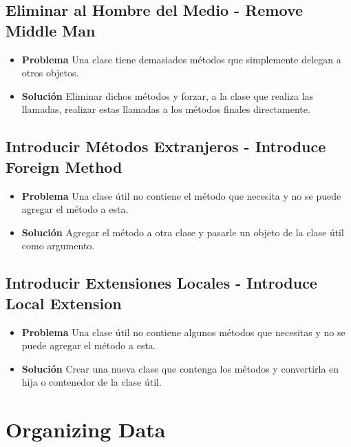 \documentclass[11pt,a4paper,oneside]{book}
\begin{document}
\subsection{Eliminar al Hombre del Medio - Remove Middle Man} 
\begin{itemize}
    \item \textbf{Problema} Una clase tiene demasiados métodos que simplemente delegan a otros objetos.
    \item \textbf{Solución} Eliminar dichos métodos y forzar, a la clase que realiza las llamadas, realizar estas llamadas a los métodos finales directamente.
\end{itemize}

 \subsection{Introducir Métodos Extranjeros - Introduce Foreign Method}  
 \begin{itemize}
    \item \textbf{Problema}  Una clase útil no contiene el método que necesita y no se puede agregar el método a esta.
    
    
    
    \item \textbf{Solución} Agregar el método a otra clase y pasarle un objeto de la clase útil como argumento.
    
    
\end{itemize}

\subsection{Introducir Extensiones Locales - Introduce Local Extension}  
    \begin{itemize}
    \item \textbf{Problema} Una clase útil no contiene algunos métodos que necesitas y no se puede agregar el método a esta.
    \item \textbf{Solución} Crear una nueva clase que contenga los métodos y convertirla en hija o contenedor de la clase útil.
\end{itemize}



\section{Organizing Data}
\end{document}
